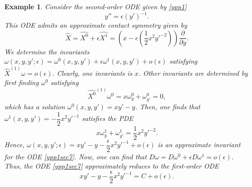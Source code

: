\documentclass[11pt,letter,subeqn]{article}
\newtheorem{example}{Example}[section]
\begin{document}
   \begin{example}
     Consider the second-order ODE given by \eqref{ypp1}
     \begin{equation}\label{ypp1sec7}
      y''=\epsilon (y')^{-1}.
      \end{equation}
     This ODE admits an approximate contact symmetry given by
     \[
    \hat{X}=\hat{X^0}+\epsilon \hat{X^1}=\left(x-\epsilon\left(\frac{1}{2}x^2y'^{-2}\right)\right)\dfrac{\partial}{\partial y}.
      \]
      We determine the invariants $\omega(x,y,y';\epsilon)=\omega^0(x,y,y')+\epsilon \omega^1(x,y,y')+o(\epsilon)$ satisfying ${\hat{X}}^{(1)}\omega=o(\epsilon).$ Clearly, one invariants is $x$. Other invariants are determined by first finding $\omega^0$ satisfying
   \[
    {\hat{X^0}}^{(1)} \omega^0=x\omega^0_y+\omega^0_{y'}=0,
   \]
   which has a solution $\omega^0(x,y,y')=xy'-y$. Then, one finds that $\omega^1(x,y,y')= -\dfrac{1}{2}x^2{y'}^{-1}$ satisfies the PDE
   \[
     x\omega^1_y+\omega^1_{y'}=\dfrac{1}{2}x^2{y'}^{-2}.
   \]
 Hence, $\omega(x,y,y';\epsilon)=xy'-y-\dfrac{\epsilon}{2}x^2{y'}^{-1}+o(\epsilon)$ is an approximate invariant for the ODE \eqref{ypp1sec7}. Now, one can find that $D\omega=D\omega^0+\epsilon D\omega^1=o(\epsilon)$. Thus, the ODE \eqref{ypp1sec7} approximately reduces to the first-order ODE
   \begin{equation}\label{IF32}
     xy'-y-\dfrac{\epsilon}{2}x^2{y'}^{-1}=C+o(\epsilon).
   \end{equation}
   \end{example}
\end{document}
